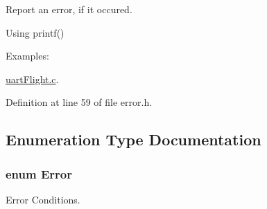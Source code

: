 Report an error, if it occured. 

Using printf() \begin{Desc}
\item[Examples\-: ]\par
\hyperlink{uart_flight_8c-example}{uart\-Flight.\-c}.\end{Desc}


Definition at line 59 of file error.\-h.



\subsection{Enumeration Type Documentation}
\hypertarget{group__error_ga2c3e4bb40f36b262a5214e2da2bca9c5}{
\subsubsection[{Error}]{\setlength{\rightskip}{0pt plus 5cm}enum {\bf Error}}}\label{group__error_ga2c3e4bb40f36b262a5214e2da2bca9c5}


Error Conditions. 

